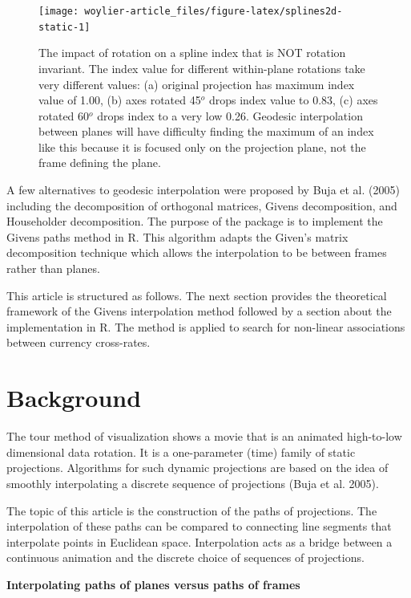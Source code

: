 \begin{figure}
\texttt{[image: woylier-article\_files/figure-latex/splines2d-static-1]} \caption{The impact of rotation on a spline index that is NOT rotation invariant. The index value for different within-plane rotations take very different values: (a) original projection has maximum index value of 1.00, (b) axes rotated 45$^o$ drops index value to 0.83, (c) axes rotated 60$^o$ drops index to a very low 0.26. Geodesic interpolation between planes will have difficulty finding the maximum of an index like this because it is focused only on the projection plane, not the frame defining the plane.}\label{fig:splines2d-static}
\end{figure}

A few alternatives to geodesic interpolation were proposed by Buja et al. (2005) including the decomposition of orthogonal matrices, Givens decomposition, and Householder decomposition. The purpose of the  package is to implement the Givens paths method in R. This algorithm adapts the Given's matrix decomposition technique which allows the interpolation to be between frames rather than planes.

This article is structured as follows. The next section provides the theoretical framework of the Givens interpolation method followed by a section about the implementation in R. The method is applied to search for non-linear associations between currency cross-rates.

\hypertarget{background}{%
\section{Background}\label{background}}

The tour method of visualization shows a movie that is an animated high-to-low dimensional data rotation. It is a one-parameter (time) family of static projections. Algorithms for such dynamic projections are based on the idea of smoothly interpolating a discrete sequence of projections (Buja et al. 2005).

The topic of this article is the construction of the paths of projections. The interpolation of these paths can be compared to connecting line segments that interpolate points in Euclidean space. Interpolation acts as a bridge between a continuous animation and the discrete choice of sequences of projections.

\textbf{Interpolating paths of planes versus paths of frames}

